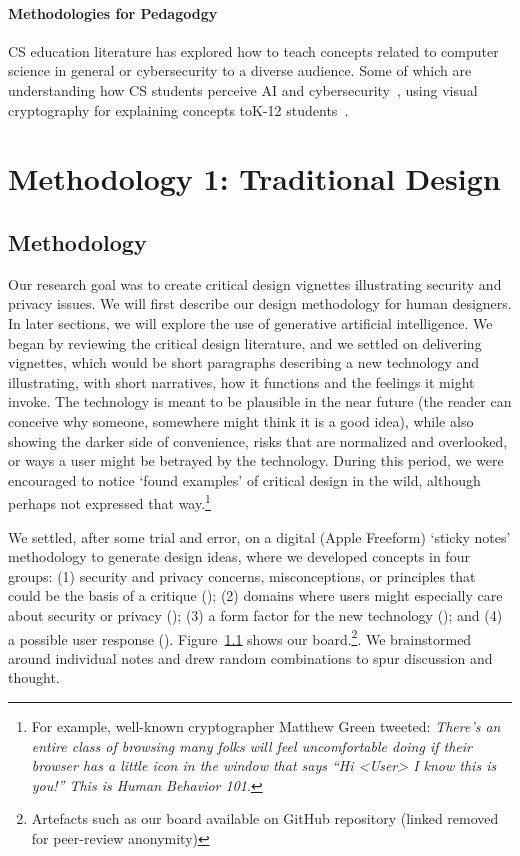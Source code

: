 \paragraph{Methodologies for Pedagodgy} 
CS education literature has explored how to teach concepts related to computer science in general or cybersecurity to a diverse audience. Some of which are understanding how CS students perceive AI and cybersecurity~\cite{ojha_computing_2023}, using visual cryptography for explaining concepts toK-12 students~\cite{rayavaram_designing_2023}.





\section{Methodology 1: Traditional Design}

\subsection{Methodology}

Our research goal was to create critical design vignettes illustrating security and privacy issues. We will first describe our design methodology for human designers. In later sections, we will explore the use of generative artificial intelligence. We began by reviewing the critical design literature, and we settled on delivering vignettes, which would be short paragraphs describing a new technology and illustrating, with short narratives, how it functions and the feelings it might invoke. The technology is meant to be plausible in the near future (the reader can conceive why someone, somewhere might think it is a good idea), while also showing the darker side of convenience, risks that are normalized and overlooked, or ways a user might be betrayed by the technology. During this period, we were encouraged to notice `found examples' of critical design in the wild, although perhaps not expressed that way.\footnote{For example, well-known cryptographer Matthew Green tweeted: \textit{There’s an entire class of browsing many folks will feel uncomfortable doing if their browser has a little icon in the window that says “Hi <User> I know this is you!” This is Human Behavior 101}.}

We settled, after some trial and error, on a digital (Apple Freeform) `sticky notes' methodology to generate design ideas, where we developed concepts in four groups: (1) security and privacy concerns, misconceptions, or principles that could be the basis of a critique (\eg); (2) domains where users might especially care about security or privacy (\eg ); (3) a form factor for the new technology (\eg ); and (4) a possible user response (\eg ). Figure~\ref{} shows our board.\footnote{Artefacts such as our board available on GitHub repository (linked removed for peer-review anonymity)}. We brainstormed around individual notes and drew random combinations to spur discussion and thought.

